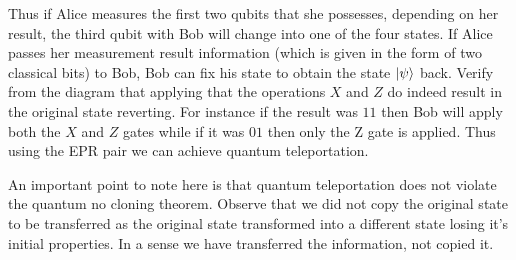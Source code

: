 Thus if Alice measures the first two qubits that she possesses, depending on her result, the third qubit with Bob will change into one of the four states. If Alice passes her measurement result information (which is given in the form of two classical bits) to Bob, Bob can fix his state to obtain the state $\ket{\psi}$ back. Verify from the diagram that applying that the operations $X$ and $Z$ do indeed result in the original state reverting. For instance if the result was $11$ then Bob will apply both the $X$ and $Z$ gates while if it was $01$ then only the Z gate is applied. Thus using the EPR pair we can achieve quantum teleportation.


An important point to note here is that quantum teleportation does not violate the quantum no cloning theorem. Observe that we did not copy the original state to be transferred as the original state transformed into a different state losing it's initial properties. In a sense we have transferred the information, not copied it.